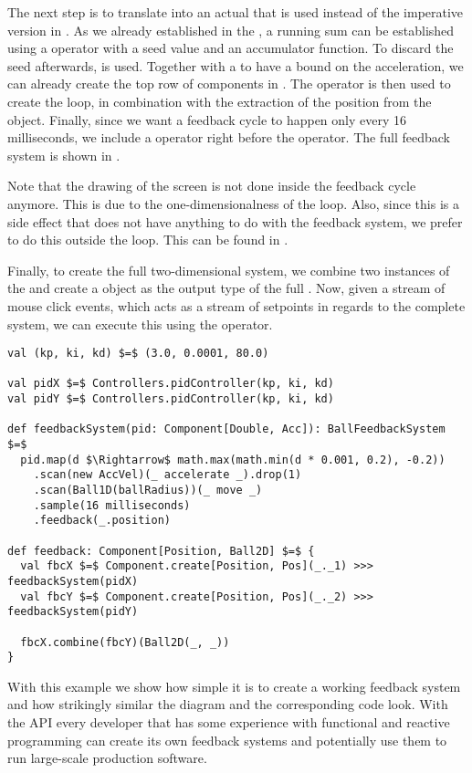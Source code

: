 The next step is to translate  into an actual  that is used instead of the imperative version in . As we already established in the , a running sum can be established using a  operator with a seed value and an accumulator function. To discard the seed afterwards,  is used. Together with a  to have a bound on the acceleration, we can already create the top row of components in . The  operator is then used to create the loop, in combination with the extraction of the position from the  object. Finally, since we want a feedback cycle to happen only every 16 milliseconds, we include a  operator right before the  operator. The full feedback system is shown in .

Note that the drawing of the screen is not done inside the feedback cycle anymore. This is due to the one-dimensionalness of the loop. Also, since this is a side effect that does not have anything to do with the feedback system, we prefer to do this outside the loop. This can be found in .

Finally, to create the full two-dimensional system, we combine two instances of the  and create a  object as the output type of the full \comp. Now, given a stream of mouse click events, which acts as a stream of setpoints in regards to the complete system, we can execute this \comp using the  operator.

\begin{minipage}{\linewidth}
\begin{lstlisting}[style=ScalaStyle, caption={Ball movement feedback system}, label={lst:ball-feedback-new}]
val (kp, ki, kd) $=$ (3.0, 0.0001, 80.0)

val pidX $=$ Controllers.pidController(kp, ki, kd)
val pidY $=$ Controllers.pidController(kp, ki, kd)

def feedbackSystem(pid: Component[Double, Acc]): BallFeedbackSystem $=$
  pid.map(d $\Rightarrow$ math.max(math.min(d * 0.001, 0.2), -0.2))
    .scan(new AccVel)(_ accelerate _).drop(1)
    .scan(Ball1D(ballRadius))(_ move _)
    .sample(16 milliseconds)
    .feedback(_.position)

def feedback: Component[Position, Ball2D] $=$ {
  val fbcX $=$ Component.create[Position, Pos](_._1) >>> feedbackSystem(pidX)
  val fbcY $=$ Component.create[Position, Pos](_._2) >>> feedbackSystem(pidY)

  fbcX.combine(fbcY)(Ball2D(_, _))
}
\end{lstlisting}
\end{minipage}

With this example we show how simple it is to create a working feedback system and how strikingly similar the diagram and the corresponding code look. With the API every developer that has some experience with functional and reactive programming can create its own feedback systems and potentially use them to run large-scale production software.
